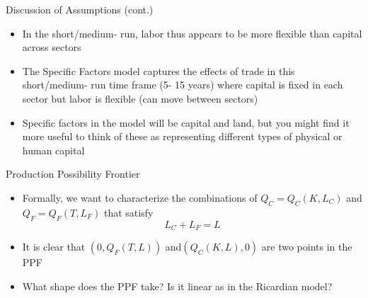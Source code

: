 \documentclass[10pt,hyperref={CJKbookmarks=true},xcolor=dvipsnames,aspectratio=169]{beamer}
\begin{document}
\begin{frame}{Discussion of Assumptions (cont.)}

\begin{itemize}
\item In the short/medium- run, labor thus appears to be more flexible than
capital across sectors 
\item The Specific Factors model captures the effects of trade in this short/medium-
run time frame (5- 15 years) where capital is fixed in each sector
but labor is flexible (can move between sectors) 
\item Specific factors in the model will be capital and land, but you might
find it more useful to think of these as representing different types
of physical or human capital 
\end{itemize}
\end{frame}

\begin{frame}{Production Possibility Frontier}

\begin{itemize}
\item Formally, we want to characterize the combinations of $Q_{C}=Q_{C}(K,L_{C})$
and $Q_{F}=Q_{F}(T,L_{F})$ that satisfy 
\[
L_{C}+L_{F}=L
\]

\item It is clear that $(0,Q_{F}(T,L))$ and$(Q_{C}(K,L),0)$ are two points
in the PPF 
\item What shape does the PPF take? Is it linear as in the Ricardian model? 
\end{itemize}
\end{frame}
\end{document}
